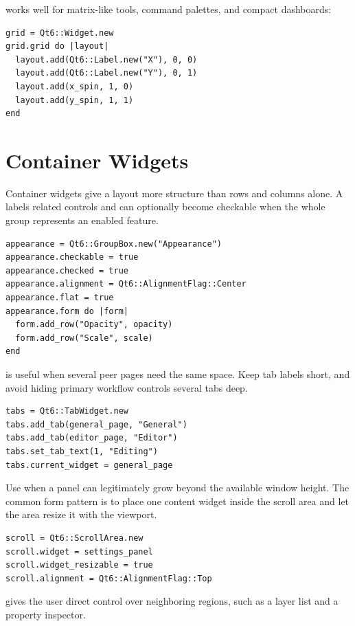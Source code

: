  works well for matrix-like tools, command palettes, and compact dashboards:

\begin{lstlisting}[style=crystal]
grid = Qt6::Widget.new
grid.grid do |layout|
  layout.add(Qt6::Label.new("X"), 0, 0)
  layout.add(Qt6::Label.new("Y"), 0, 1)
  layout.add(x_spin, 1, 0)
  layout.add(y_spin, 1, 1)
end
\end{lstlisting}

\section{Container Widgets}

Container widgets give a layout more structure than rows and columns alone. A  labels related controls and can optionally become checkable when the whole group represents an enabled feature.

\begin{lstlisting}[style=crystal]
appearance = Qt6::GroupBox.new("Appearance")
appearance.checkable = true
appearance.checked = true
appearance.alignment = Qt6::AlignmentFlag::Center
appearance.flat = true
appearance.form do |form|
  form.add_row("Opacity", opacity)
  form.add_row("Scale", scale)
end
\end{lstlisting}

 is useful when several peer pages need the same space. Keep tab labels short, and avoid hiding primary workflow controls several tabs deep.

\begin{lstlisting}[style=crystal]
tabs = Qt6::TabWidget.new
tabs.add_tab(general_page, "General")
tabs.add_tab(editor_page, "Editor")
tabs.set_tab_text(1, "Editing")
tabs.current_widget = general_page
\end{lstlisting}

Use  when a panel can legitimately grow beyond the available window height. The common form pattern is to place one content widget inside the scroll area and let the area resize it with the viewport.

\begin{lstlisting}[style=crystal]
scroll = Qt6::ScrollArea.new
scroll.widget = settings_panel
scroll.widget_resizable = true
scroll.alignment = Qt6::AlignmentFlag::Top
\end{lstlisting}

 gives the user direct control over neighboring regions, such as a layer list and a property inspector.

